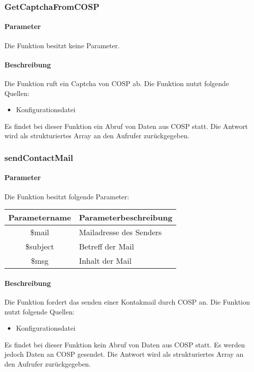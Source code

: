 \subsubsection{GetCaptchaFromCOSP}
\paragraph{Parameter} Die Funktion besitzt keine Parameter.
\paragraph{Beschreibung} Die Funktion ruft ein Captcha von {\glqq COSP\grqq} ab. Die Funktion nutzt folgende Quellen:
\begin{itemize}
	\item Konfigurationsdatei
\end{itemize}
Es findet bei dieser Funktion ein Abruf von Daten aus {\glqq COSP\grqq} statt. Die Antwort wird als strukturiertes Array an den Aufrufer zurückgegeben.
\subsubsection{sendContactMail}
\paragraph{Parameter} Die Funktion besitzt folgende Parameter:
\begin{table}[H]
	\begin{tabular}{|c|p{11cm}|}
		\hline
		\textbf{Parametername} & \textbf{Parameterbeschreibung} \\ \hline
		\$mail    & Mailadresse des Senders \\ \hline
		\$subject & Betreff der Mail \\ \hline
		\$msg     & Inhalt der Mail \\ \hline
	\end{tabular}
\end{table}
\paragraph{Beschreibung} Die Funktion fordert das senden einer Kontakmail durch {\glqq COSP\grqq} an. Die Funktion nutzt folgende Quellen:
\begin{itemize}
	\item Konfigurationsdatei
\end{itemize}
Es findet bei dieser Funktion kein Abruf von Daten aus {\glqq COSP\grqq} statt. Es werden jedoch Daten an {\glqq COSP\grqq} gesendet. Die Antwort wird als strukturiertes Array an den Aufrufer zurückgegeben.
